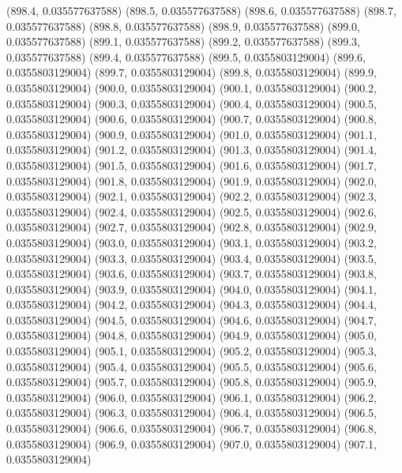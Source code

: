 {					(898.4, 0.035577637588)
					(898.5, 0.035577637588)
					(898.6, 0.035577637588)
					(898.7, 0.035577637588)
					(898.8, 0.035577637588)
					(898.9, 0.035577637588)
					(899.0, 0.035577637588)
					(899.1, 0.035577637588)
					(899.2, 0.035577637588)
					(899.3, 0.035577637588)
					(899.4, 0.035577637588)
					(899.5, 0.0355803129004)
					(899.6, 0.0355803129004)
					(899.7, 0.0355803129004)
					(899.8, 0.0355803129004)
					(899.9, 0.0355803129004)
					(900.0, 0.0355803129004)
					(900.1, 0.0355803129004)
					(900.2, 0.0355803129004)
					(900.3, 0.0355803129004)
					(900.4, 0.0355803129004)
					(900.5, 0.0355803129004)
					(900.6, 0.0355803129004)
					(900.7, 0.0355803129004)
					(900.8, 0.0355803129004)
					(900.9, 0.0355803129004)
					(901.0, 0.0355803129004)
					(901.1, 0.0355803129004)
					(901.2, 0.0355803129004)
					(901.3, 0.0355803129004)
					(901.4, 0.0355803129004)
					(901.5, 0.0355803129004)
					(901.6, 0.0355803129004)
					(901.7, 0.0355803129004)
					(901.8, 0.0355803129004)
					(901.9, 0.0355803129004)
					(902.0, 0.0355803129004)
					(902.1, 0.0355803129004)
					(902.2, 0.0355803129004)
					(902.3, 0.0355803129004)
					(902.4, 0.0355803129004)
					(902.5, 0.0355803129004)
					(902.6, 0.0355803129004)
					(902.7, 0.0355803129004)
					(902.8, 0.0355803129004)
					(902.9, 0.0355803129004)
					(903.0, 0.0355803129004)
					(903.1, 0.0355803129004)
					(903.2, 0.0355803129004)
					(903.3, 0.0355803129004)
					(903.4, 0.0355803129004)
					(903.5, 0.0355803129004)
					(903.6, 0.0355803129004)
					(903.7, 0.0355803129004)
					(903.8, 0.0355803129004)
					(903.9, 0.0355803129004)
					(904.0, 0.0355803129004)
					(904.1, 0.0355803129004)
					(904.2, 0.0355803129004)
					(904.3, 0.0355803129004)
					(904.4, 0.0355803129004)
					(904.5, 0.0355803129004)
					(904.6, 0.0355803129004)
					(904.7, 0.0355803129004)
					(904.8, 0.0355803129004)
					(904.9, 0.0355803129004)
					(905.0, 0.0355803129004)
					(905.1, 0.0355803129004)
					(905.2, 0.0355803129004)
					(905.3, 0.0355803129004)
					(905.4, 0.0355803129004)
					(905.5, 0.0355803129004)
					(905.6, 0.0355803129004)
					(905.7, 0.0355803129004)
					(905.8, 0.0355803129004)
					(905.9, 0.0355803129004)
					(906.0, 0.0355803129004)
					(906.1, 0.0355803129004)
					(906.2, 0.0355803129004)
					(906.3, 0.0355803129004)
					(906.4, 0.0355803129004)
					(906.5, 0.0355803129004)
					(906.6, 0.0355803129004)
					(906.7, 0.0355803129004)
					(906.8, 0.0355803129004)
					(906.9, 0.0355803129004)
					(907.0, 0.0355803129004)
					(907.1, 0.0355803129004)
}

